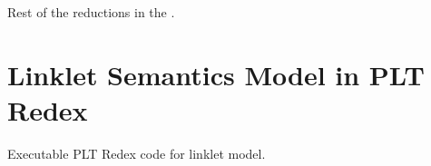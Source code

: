 \begin{appendices}
    \begin{figure-here}
        Rest of the reductions in the .
    \end{figure-here}

\chapter[\texorpdfstring{Linklet Semantics Model in PLT Redex}{Appendix D}]{Linklet Semantics Model in PLT Redex}
\label{appendix:linklet-semantics-model-redex-code}

    \begin{figure-here}
        Executable PLT Redex code for linklet model.
    \end{figure-here}



\end{appendices}